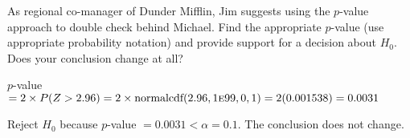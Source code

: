 \documentclass[noanswers]{exam}
\begin{document}
\begin{questions}
\begin{parts}
\begin{solution}[\stretch{1}]
\end{solution} 

\end{parts}


\question As regional co-manager of Dunder Mifflin, Jim suggests using the $p$-value approach to double check behind Michael. Find the appropriate $p$-value (use appropriate probability notation) and provide support for a decision about $H_0$. Does your conclusion change at all?

\begin{solution}[\stretch{1}]

\vspace{3mm}

$p$-value $=2\times P(Z>2.96)=2\times \text{normalcdf}(2.96,1\text{\sc{e}}99,0,1)=2(0.001538)=0.0031$

\vspace{3mm}

Reject $H_0$ because $p$-value $=0.0031<\alpha=0.1$. The conclusion does not change.

\vspace{3mm}

\end{solution} 

\end{questions}




\end{document}
